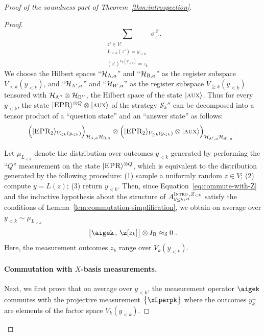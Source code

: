 \documentclass[11pt]{article}
\theoremstyle{definition}
\newcommand{\ket}[1]{|#1\rangle}
\newcommand{\Id}{\ensuremath{I}}
\newcommand{\mH}{\ensuremath{\mathcal{H}}}
\newcommand{\ib}{\Id_\bob}
\newcommand{\strategy}{\mathscr{S}}
\newcommand{\labelstyle}[1]{\ensuremath{\textsc{#1}}\xspace}
\newcommand{\EPR}{\labelstyle{EPR}}
\newcommand{\aux}{\labelstyle{aux}}
\newcommand{\alice}{\labelstyle{A}}
\newcommand{\bob}{\labelstyle{B}}
\newcommand{\typestyle}[1]{\ensuremath{\textsc{#1}}\xspace}
\newcommand{\Intro}{\typestyle{Intro}}
\begin{document}
\begin{proof}[Proof of the soundness part of Theorem~\ref{thm:introspection}]
\begin{proof}
    \[
    	\sum_{\substack{z' \in V: \\ L_{<k}(z') = y_{<k} \\ (z')^{V_k(y_{<k})} = z_k}} \sigma^Z_{z'}.
    \]
    We choose the Hilbert spaces ``$\mH_{\alice,a}$'' and ``$\mH_{\bob,a}$'' as
    the register subspace $ V_{<k}(y_{<k})$, and ``$\mH_{\alice',a}$'' and
    ``$\mH_{\bob',a}$'' as the register subspace $V_{\geq k}(y_{<k})$ tensored
    with $\mH_{\alice''} \otimes \mH_{\bob''}$, the Hilbert space of the state
    $\ket{\aux}$.
    Thus for every $y_{<k}$, the state $\ket{\EPR}^{\otimes Q} \otimes
    \ket{\aux}$ of the strategy $\strategy_k''$ can be decomposed into a tensor
    product of a ``question state'' and an ``answer state'' as follows:
    \[
      \Big ( \ket{\EPR_2}_{V_{<k}(y_{<k})} \Big)_{\mH_{\alice,a} \mH_{\bob,a}}
      \otimes \Big ( \ket{\EPR_2}_{V_{\geq k}(y_{<k})} \otimes \ket{\aux}
      \Big)_{\mH_{\alice',a} \mH_{\bob',a}}\;.
    \]

    Let $\mu_{L_{<k}}$ denote the distribution over outcomes $y_{< k}$ generated
    by performing the ``$Q$'' measurement on the state $\ket{\EPR}^{\otimes Q}$,
    which is equivalent to the distribution generated by the following
    procedure: (1) sample a uniformly random $z \in V$; (2) compute $y = L(z)$;
    (3) return $y_{<k}$.
    Then, since Equation~\eqref{eq:commute-with-Z} and the inductive hypothesis
    about the structure of $A^{\Intro\,,Z_{<k}}_{y_{\leq k},\,a}$ satisfy the
    conditions of Lemma~\ref{lem:commutation-simplification}, we obtain on
    average over $y_{< k} \sim \mu_{L_{< k}}$
    \begin{equation}
      \label{eq:intro-sound-5}
      \bigl[ \aigek \,,\, \z[z_k] \bigr] \otimes \ib \approx_\delta 0 \;.
    \end{equation}
    Here, the measurement outcomes $z_k$ range over $V_k(y_{<k})$.

    \paragraph{Commutation with $X$-basis measurements.}
    Next, we first prove that on average over $y_{< k}$, the measurement
    operator $\aigek$ commutes with the projective measurement
    $\bigl\{ \xLperpk \bigr\}$ where the
    outcomes $y_k^\perp$ are elements of the factor space $V_k(y_{<k})$.
  

\end{proof}
\end{proof}
\end{document}
